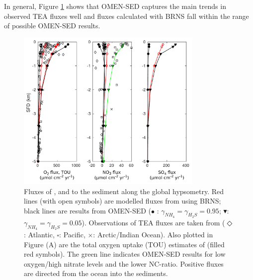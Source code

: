 \documentclass[gmd, manuscript]{copernicus}
\begin{document}
In general, Figure \ref{fig:hypsometry} shows that OMEN-SED captures the main trends in observed TEA fluxes well and fluxes calculated with BRNS fall within the range of possible OMEN-SED results. 
\begin{figure}[htbp]
\begin{center}
	\includegraphics[width=0.8\textwidth]{figures/0_OMEN_Thullner_hypsometry_fluxes_diff_NCratio.pdf}
	\caption{Fluxes of ,  and  to the sediment along the global hypsometry. 
	Red lines (with open symbols) are modelled fluxes from \citet{thullner_global_scale_2009} using BRNS; black lines are results from OMEN-SED ($\bullet$ : $\gamma_{NH_4}=\gamma_{H_2S}=0.95$; 
	$\blacktriangledown$: $\gamma_{NH_4}=\gamma_{H_2S}=0.05$). 
	Observations of TEA fluxes are taken from \citet{middelburg_denitrification_1996} ($\Diamond$: Atlantic, $\square$: Pacific, $\times$: Arctic/Indian Ocean). 
	Also plotted in Figure (A) are the total oxygen uptake (TOU) estimates of \citet{thullner_global_scale_2009} (filled red symbols). The green line indicates OMEN-SED results for low oxygen/high nitrate levels and the lower 
	NC-ratio. Positive fluxes are directed from the ocean into the sediments.
	}\label{fig:hypsometry}
\end{center}
\end{figure}
\end{document}
